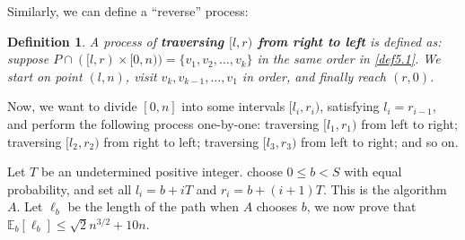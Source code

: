 \documentclass[12pt]{article}
\theoremstyle{plain}
\newtheorem{definition}{Definition}[section]
\begin{document}
Similarly, we can define a ``reverse'' process:
\begin{definition}
A process of \textbf{traversing $[l,r)$ from right to left} is defined as: suppose $P\cap ([l,r)\times [0,n))=\{v_1,v_2,\ldots,v_k\}$ in the same order in \ref{def5.1}. We start on point $(l,n)$, visit $v_k,v_{k-1},\ldots,v_1$ in order, and finally reach $(r,0)$.
\end{definition}

Now, we want to divide $[0,n]$ into some intervals $[l_i,r_i)$, satisfying $l_i=r_{i-1}$, and perform the following process one-by-one: traversing $[l_1,r_1)$ from left to right; traversing $[l_2,r_2)$ from right to left; traversing $[l_3,r_3)$ from left to right; and so on. 

Let $T$ be an undetermined positive integer.  choose $0\le b<S$ with equal probability, and set all $l_i=b+iT$ and $r_i=b+(i+1)T$. This is the algorithm $A$. Let $\ell_b$ be the length of the path when $A$ chooses $b$, we now prove that $\mathbb{E}_b[\ell_b]\le \sqrt{2}n^{3/2}+10n$.


\end{document}
